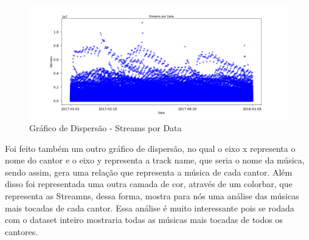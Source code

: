 \documentclass[11pt]{article}
\makeatletter
\def\maxwidth{\ifdim\Gin@nat@width>\linewidth\linewidth
    \else\Gin@nat@width\fi}
\let\Oldincludegraphics\includegraphics
\renewcommand{\includegraphics}[1]{\Oldincludegraphics[width=.8\maxwidth]{#1}}
\makeatother
\begin{document}
\begin{figure}
\centering
\includegraphics{StreamsPorData.png}
\caption{Gráfico de Dispersão - Streams por Data}
\end{figure}

    Foi feito também um outro gráfico de dispersão, no qual o eixo x
representa o nome do cantor e o eixo y representa a track name, que
seria o nome da música, sendo assim, gera uma relação que representa a
música de cada cantor. Além disso foi representada uma outra camada de
cor, através de um colorbar, que representa as Streamns, dessa forma,
mostra para nós uma análise das músicas mais tocadas de cada cantor.
Essa análise é muito interessante pois se rodada com o dataset inteiro
mostraria todas as músicas mais tocadas de todos os cantores.
\end{document}
